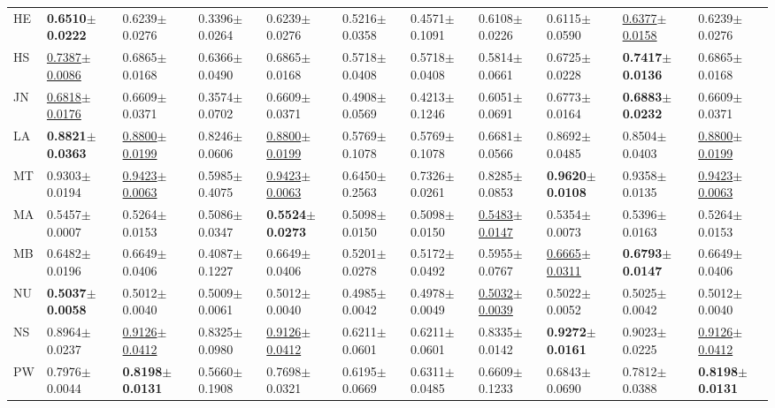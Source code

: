 \begin{tabular}{lllllllllll}
HE & \textbf{0.6510$\pm$0.0222} & 0.6239$\pm$0.0276 & 0.3396$\pm$0.0264 & 0.6239$\pm$0.0276 & 0.5216$\pm$0.0358 & 0.4571$\pm$0.1091 & 0.6108$\pm$0.0226 & 0.6115$\pm$0.0590 & \underline{0.6377$\pm$0.0158} & 0.6239$\pm$0.0276 \\
HS & \underline{0.7387$\pm$0.0086} & 0.6865$\pm$0.0168 & 0.6366$\pm$0.0490 & 0.6865$\pm$0.0168 & 0.5718$\pm$0.0408 & 0.5718$\pm$0.0408 & 0.5814$\pm$0.0661 & 0.6725$\pm$0.0228 & \textbf{0.7417$\pm$0.0136} & 0.6865$\pm$0.0168 \\
JN & \underline{0.6818$\pm$0.0176} & 0.6609$\pm$0.0371 & 0.3574$\pm$0.0702 & 0.6609$\pm$0.0371 & 0.4908$\pm$0.0569 & 0.4213$\pm$0.1246 & 0.6051$\pm$0.0691 & 0.6773$\pm$0.0164 & \textbf{0.6883$\pm$0.0232} & 0.6609$\pm$0.0371 \\
LA & \textbf{0.8821$\pm$0.0363} & \underline{0.8800$\pm$0.0199} & 0.8246$\pm$0.0606 & \underline{0.8800$\pm$0.0199} & 0.5769$\pm$0.1078 & 0.5769$\pm$0.1078 & 0.6681$\pm$0.0566 & 0.8692$\pm$0.0485 & 0.8504$\pm$0.0403 & \underline{0.8800$\pm$0.0199} \\
MT & 0.9303$\pm$0.0194 & \underline{0.9423$\pm$0.0063} & 0.5985$\pm$0.4075 & \underline{0.9423$\pm$0.0063} & 0.6450$\pm$0.2563 & 0.7326$\pm$0.0261 & 0.8285$\pm$0.0853 & \textbf{0.9620$\pm$0.0108} & 0.9358$\pm$0.0135 & \underline{0.9423$\pm$0.0063} \\
MA & 0.5457$\pm$0.0007 & 0.5264$\pm$0.0153 & 0.5086$\pm$0.0347 & \textbf{0.5524$\pm$0.0273} & 0.5098$\pm$0.0150 & 0.5098$\pm$0.0150 & \underline{0.5483$\pm$0.0147} & 0.5354$\pm$0.0073 & 0.5396$\pm$0.0163 & 0.5264$\pm$0.0153 \\
MB & 0.6482$\pm$0.0196 & 0.6649$\pm$0.0406 & 0.4087$\pm$0.1227 & 0.6649$\pm$0.0406 & 0.5201$\pm$0.0278 & 0.5172$\pm$0.0492 & 0.5955$\pm$0.0767 & \underline{0.6665$\pm$0.0311} & \textbf{0.6793$\pm$0.0147} & 0.6649$\pm$0.0406 \\
NU & \textbf{0.5037$\pm$0.0058} & 0.5012$\pm$0.0040 & 0.5009$\pm$0.0061 & 0.5012$\pm$0.0040 & 0.4985$\pm$0.0042 & 0.4978$\pm$0.0049 & \underline{0.5032$\pm$0.0039} & 0.5022$\pm$0.0052 & 0.5025$\pm$0.0042 & 0.5012$\pm$0.0040 \\
NS & 0.8964$\pm$0.0237 & \underline{0.9126$\pm$0.0412} & 0.8325$\pm$0.0980 & \underline{0.9126$\pm$0.0412} & 0.6211$\pm$0.0601 & 0.6211$\pm$0.0601 & 0.8335$\pm$0.0142 & \textbf{0.9272$\pm$0.0161} & 0.9023$\pm$0.0225 & \underline{0.9126$\pm$0.0412} \\
PW & 0.7976$\pm$0.0044 & \textbf{0.8198$\pm$0.0131} & 0.5660$\pm$0.1908 & 0.7698$\pm$0.0321 & 0.6195$\pm$0.0669 & 0.6311$\pm$0.0485 & 0.6609$\pm$0.1233 & 0.6843$\pm$0.0690 & 0.7812$\pm$0.0388 & \textbf{0.8198$\pm$0.0131} \\

\end{tabular}
